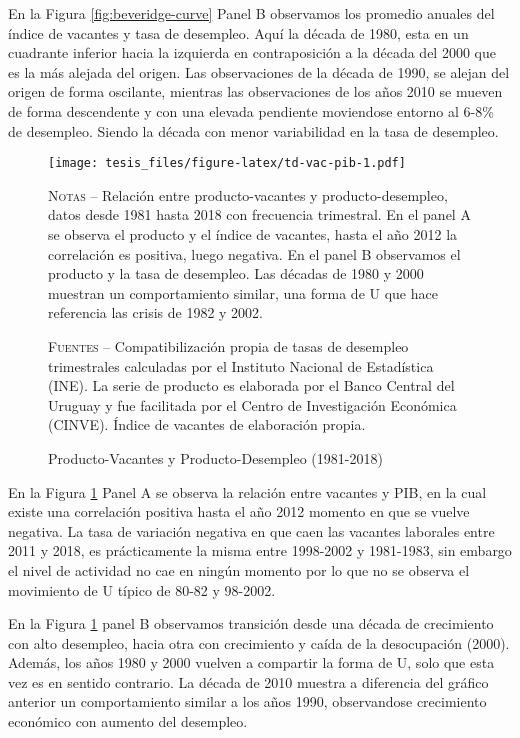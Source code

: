 \documentclass[12pt,oneside]{reedthesis}
\makeatletter
\def\maxwidth{ %
  \ifdim\Gin@nat@width>\linewidth
    \linewidth
  \else
    \Gin@nat@width
  \fi
}
\makeatother
\begin{document}
En la Figura \ref{fig:beveridge-curve} Panel B observamos los promedio anuales del índice de vacantes y tasa de desempleo. Aquí la década de 1980, esta en un cuadrante inferior hacia la izquierda en contraposición a la década del 2000 que es la más alejada del origen. Las observaciones de la década de 1990, se alejan del origen de forma oscilante, mientras las observaciones de los años 2010 se mueven de forma descendente y con una elevada pendiente moviendose entorno al 6-8\% de desempleo. Siendo la década con menor variabilidad en la tasa de desempleo.
\begin{figure}
\texttt{[image: tesis\_files/figure-latex/td-vac-pib-1.pdf]}
\caption{Producto-Vacantes y Producto-Desempleo (1981-2018)}\label{fig:td-vac-pib}\textsc{}

\footnotesize\textsc{Notas} -- Relación entre producto-vacantes y producto-desempleo, datos desde 1981 hasta 2018 con frecuencia trimestral. En el panel A se observa el producto y el índice de vacantes, hasta el año 2012 la correlación es positiva, luego negativa. En el panel B observamos el producto y la tasa de desempleo. Las décadas de 1980 y 2000 muestran un comportamiento similar, una forma de U que hace referencia las crisis de 1982 y 2002.

\textsc{Fuentes} -- Compatibilización propia de tasas de desempleo trimestrales calculadas por el Instituto Nacional de Estadística (INE). La serie de producto es elaborada por el Banco Central del Uruguay y fue facilitada por el Centro de Investigación Económica (CINVE). Índice de vacantes de elaboración propia.
\end{figure}
En la Figura \ref{fig:td-vac-pib} Panel A se observa la relación entre vacantes y PIB, en la cual existe una correlación positiva hasta el año 2012 momento en que se vuelve negativa. La tasa de variación negativa en que caen las vacantes laborales entre 2011 y 2018, es prácticamente la misma entre 1998-2002 y 1981-1983, sin embargo el nivel de actividad no cae en ningún momento por lo que no se observa el movimiento de U típico de 80-82 y 98-2002.

En la Figura \ref{fig:td-vac-pib} panel B observamos transición desde una década de crecimiento con alto desempleo, hacia otra con crecimiento y caída de la desocupación (2000). Además, los años 1980 y 2000 vuelven a compartir la forma de U, solo que esta vez es en sentido contrario. La década de 2010 muestra a diferencia del gráfico anterior un comportamiento similar a los años 1990, observandose crecimiento económico con aumento del desempleo.
\end{document}

